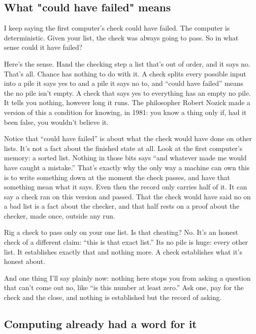 \documentclass[11pt,twoside]{article}
\theoremstyle{thielethm}
\theoremstyle{thieledef}
\theoremstyle{thieledef}
\theoremstyle{thieledef}
\theoremstyle{thielethm}
\theoremstyle{thieleobs}
\theoremstyle{thielethm}
\begin{document}
\subsection{What "could have failed" means}

I keep saying the first computer's check could have failed. The computer is deterministic. Given your list, the check was always going to pass. So in what sense could it have failed?

Here's the sense. Hand the checking step a list that's out of order, and it says no. That's all. Chance has nothing to do with it. A check splits every possible input into a pile it says yes to and a pile it says no to, and ``could have failed'' means the no pile isn't empty. A check that says yes to everything has an empty no pile. It tells you nothing, however long it runs. The philosopher Robert Nozick made a version of this a condition for knowing, in 1981: you know a thing only if, had it been false, you wouldn't believe it.

Notice that ``could have failed'' is about what the check would have done on other lists. It's not a fact about the finished state at all. Look at the first computer's memory: a sorted list. Nothing in those bits says ``and whatever made me would have caught a mistake.'' That's exactly why the only way a machine can own this is to write something down at the moment the check passes, and have that something mean what it says. Even then the record only carries half of it. It can say a check ran on this version and passed. That the check would have said no on a bad list is a fact about the checker, and that half rests on a proof about the checker, made once, outside any run.

Rig a check to pass only on your one list. Is that cheating? No. It's an honest check of a different claim: ``this is that exact list.'' Its no pile is huge: every other list. It establishes exactly that and nothing more. A check establishes what it's honest about.

And one thing I'll say plainly now: nothing here stops you from asking a question that can't come out no, like ``is this number at least zero.'' Ask one, pay for the check and the close, and nothing is established but the record of asking.

\subsection{Computing already had a word for it}
\end{document}

